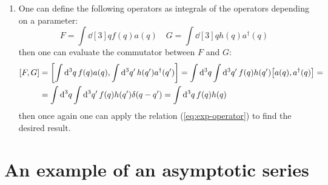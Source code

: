 \documentclass[11pt, oneside]{article}   	%
\begin{document}
\begin{enumerate}[label=\alph*)]
\item One can define the following operators as integrals of the operators depending on a parameter:
\[
	F = \int \dd[3]{q} f(q) a(q) \quad G = \int \dd[3]{q} h(q) a^\dagger(q)
\]
then one can evaluate the commutator between $F$ and $G$:
\begin{align*}
	\comm{F}{G} &= \comm{\int \dd[3]{q} f(q) a(q) }{\int \dd[3]{q'} h(q') a^\dagger(q') } = \int \dd[3]{q} \int \dd[3]{q'} f(q) h(q')\comm{a(q)}{a^\dagger (q)} = \\
	&= \int \dd[3]{q} \int \dd[3]{q'} f(q) h(q') \delta(q-q') = \int \dd[3]{q} f(q) h(q)
\end{align*}
then once again one can apply the relation (\ref{eq:exp-operator}) to find the desired result.

\end{enumerate}

\section{An example of an asymptotic series}
\end{document}
